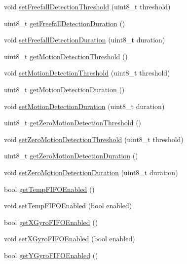 \begin{DoxyCompactItemize}
\item 
void \hyperlink{class_m_p_u6050_af704e1a4eb01522b146abeba78c32716}{set\+Freefall\+Detection\+Threshold} (uint8\+\_\+t threshold)
\item 
uint8\+\_\+t \hyperlink{class_m_p_u6050_a3cff6b9613ad01aa1a51c287f5c5e329}{get\+Freefall\+Detection\+Duration} ()
\item 
void \hyperlink{class_m_p_u6050_a41eeb40a654465966d260e3d31c4de4b}{set\+Freefall\+Detection\+Duration} (uint8\+\_\+t duration)
\item 
uint8\+\_\+t \hyperlink{class_m_p_u6050_ab7a825b1b8b86cebda308289630795e7}{get\+Motion\+Detection\+Threshold} ()
\item 
void \hyperlink{class_m_p_u6050_aa23c8d66502345c30915e69975fd2cc9}{set\+Motion\+Detection\+Threshold} (uint8\+\_\+t threshold)
\item 
uint8\+\_\+t \hyperlink{class_m_p_u6050_a8ba035c2ae4a05d7e51b0d29e4924fb0}{get\+Motion\+Detection\+Duration} ()
\item 
void \hyperlink{class_m_p_u6050_a6d81616aaa47539217057891c91ff08f}{set\+Motion\+Detection\+Duration} (uint8\+\_\+t duration)
\item 
uint8\+\_\+t \hyperlink{class_m_p_u6050_ad941c1e844dc9230675c115734599ea3}{get\+Zero\+Motion\+Detection\+Threshold} ()
\item 
void \hyperlink{class_m_p_u6050_a347a51fd25de20b9ead4659015ef793b}{set\+Zero\+Motion\+Detection\+Threshold} (uint8\+\_\+t threshold)
\item 
uint8\+\_\+t \hyperlink{class_m_p_u6050_a04c0fcdcd0157b6dbf74d4901424801e}{get\+Zero\+Motion\+Detection\+Duration} ()
\item 
void \hyperlink{class_m_p_u6050_a6d25a21e1673682f096399b719c66d2c}{set\+Zero\+Motion\+Detection\+Duration} (uint8\+\_\+t duration)
\item 
bool \hyperlink{class_m_p_u6050_a913c2095001e204b5b09f8382a86d2ca}{get\+Temp\+F\+I\+F\+O\+Enabled} ()
\item 
void \hyperlink{class_m_p_u6050_ae528a25b4997ad0e3091a012e4e4419e}{set\+Temp\+F\+I\+F\+O\+Enabled} (bool enabled)
\item 
bool \hyperlink{class_m_p_u6050_ada9a553176b57815f23fb7d71bb85c9d}{get\+X\+Gyro\+F\+I\+F\+O\+Enabled} ()
\item 
void \hyperlink{class_m_p_u6050_a53a03d1f255a62f01375c870cdc85767}{set\+X\+Gyro\+F\+I\+F\+O\+Enabled} (bool enabled)
\item 
bool \hyperlink{class_m_p_u6050_a86c85d5b5c93df82394435b868e17463}{get\+Y\+Gyro\+F\+I\+F\+O\+Enabled} ()

\end{DoxyCompactItemize}

